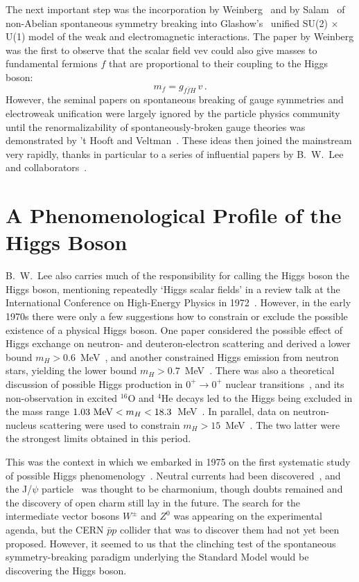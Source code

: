 \documentclass[12pt]{article}
\newcommand{\beq}{\begin{equation}}
\newcommand{\eeq}{\end{equation}}
\numberwithin{equation}{section}
\begin{document}
The next important step was the incorporation by
Weinberg~\cite{Weinberg} and by Salam~\cite{Salam} of non-Abelian
spontaneous symmetry breaking into Glashow's~\cite{Glashow} unified
SU(2) $\times$ U(1) model of the weak and electromagnetic
interactions. The paper by Weinberg was the first to observe that the
scalar field vev could also give masses to fundamental fermions $f$ that
are proportional to their coupling to the Higgs boson:
%
\beq m_f = g_{f\bar f H} \, v \, .\label{fmass}\eeq
However, the seminal papers on spontaneous breaking of gauge symmetries and
electroweak unification were largely ignored by the particle physics
community until the renormalizability of spontaneously-broken gauge theories was demonstrated by
't Hooft and Veltman~\cite{tHV}. These ideas then joined the mainstream very rapidly, thanks
in particular to a series of influential papers by B.~W.~Lee and collaborators~\cite{LZJ,FLS}.

\section{A Phenomenological Profile of the Higgs Boson}

B.~W.~Lee also carries much of the responsibility for calling the
Higgs boson the Higgs boson, mentioning repeatedly `Higgs scalar
fields' in a review talk at the International Conference on
High-Energy Physics in 1972~\cite{Lee}. However, in the early 1970s
there were only a few suggestions how to constrain or exclude the
possible existence of a physical Higgs boson. One paper considered the
possible effect of Higgs exchange on neutron- and deuteron-electron
scattering and derived a lower bound $m_H > 0.6$~MeV~\cite{nue}, and
another constrained Higgs emission from neutron stars, yielding the
lower bound $m_H > 0.7$~MeV~\cite{SS}.  There was also a theoretical
discussion of possible Higgs production in $0^+ \to 0^+$ nuclear
transitions~\cite{RSW}, and its non-observation in excited $^{16}$O
and $^4$He decays led to the Higgs being excluded in the mass range
$1.03~{\rm MeV} < m_H < 18.3$~MeV~\cite{KWB}. In parallel, data on
neutron-nucleus scattering were used to constrain $m_H >
15$~MeV~\cite{BE}.  The two latter were the strongest limits obtained
in this period.

This was the context in which we embarked in 1975 on the first systematic study of possible Higgs phenomenology~\cite{EGN}.
Neutral currents had been discovered~\cite{NC}, and the J/$\psi$ particle~\cite{Jpsi} was thought to be charmonium, though
doubts remained and the discovery of open charm still lay in the future. The search for the intermediate vector
bosons $W^\pm$ and $Z^0$ was appearing on the experimental agenda, but the CERN ${\bar p}p$
collider that was to discover them had not yet been proposed. However, it seemed to us that the clinching
test of the spontaneous symmetry-breaking paradigm underlying the Standard Model would be discovering
the Higgs boson.
\end{document}
